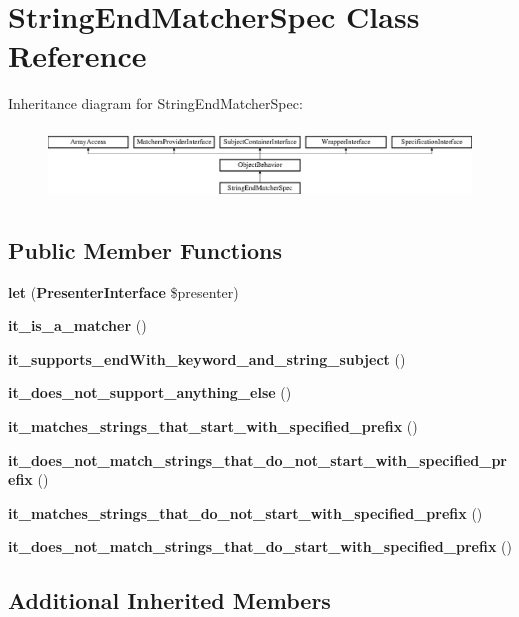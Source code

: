 \section{String\+End\+Matcher\+Spec Class Reference}
\label{classspec_1_1_php_spec_1_1_matcher_1_1_string_end_matcher_spec}
Inheritance diagram for String\+End\+Matcher\+Spec\+:\begin{figure}[H]
\begin{center}
\leavevmode
\includegraphics[height=1.953488cm]{classspec_1_1_php_spec_1_1_matcher_1_1_string_end_matcher_spec}
\end{center}
\end{figure}
\subsection*{Public Member Functions}
\begin{DoxyCompactItemize}
\item 
{\bf let} ({\bf Presenter\+Interface} \$presenter)
\item 
{\bf it\+\_\+is\+\_\+a\+\_\+matcher} ()
\item 
{\bf it\+\_\+supports\+\_\+end\+With\+\_\+keyword\+\_\+and\+\_\+string\+\_\+subject} ()
\item 
{\bf it\+\_\+does\+\_\+not\+\_\+support\+\_\+anything\+\_\+else} ()
\item 
{\bf it\+\_\+matches\+\_\+strings\+\_\+that\+\_\+start\+\_\+with\+\_\+specified\+\_\+prefix} ()
\item 
{\bf it\+\_\+does\+\_\+not\+\_\+match\+\_\+strings\+\_\+that\+\_\+do\+\_\+not\+\_\+start\+\_\+with\+\_\+specified\+\_\+prefix} ()
\item 
{\bf it\+\_\+matches\+\_\+strings\+\_\+that\+\_\+do\+\_\+not\+\_\+start\+\_\+with\+\_\+specified\+\_\+prefix} ()
\item 
{\bf it\+\_\+does\+\_\+not\+\_\+match\+\_\+strings\+\_\+that\+\_\+do\+\_\+start\+\_\+with\+\_\+specified\+\_\+prefix} ()
\end{DoxyCompactItemize}
\subsection*{Additional Inherited Members}


